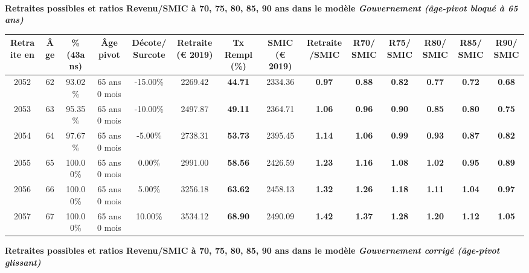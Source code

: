  ~\\{\bf \noindent Retraites possibles et ratios Revenu/SMIC à 70, 75, 80, 85, 90 ans dans le modèle \emph{Gouvernement (âge-pivot bloqué à 65 ans)}}  
 
\begin{adjustbox}{max width=\textwidth} 
\begin{tabular}[htb]{|c|c||c|c|c||c|c||c|c||c|c|c|c|c|} 
\hline 
 Retraite en &  Âge &  \%(43ans) &  Âge pivot &  Décote/Surcote &  Retraite (\euro{} 2019) &  Tx Rempl(\%) &  SMIC (\euro{} 2019) &  Retraite/SMIC &  R70/SMIC &  R75/SMIC &  R80/SMIC &  R85/SMIC &  R90/SMIC \\ 
\hline \hline 
 2052 &  62 &  93.02\% &  65 ans 0 mois &  -15.00\% &  2269.42 &  {\bf 44.71} &  2334.36 &  {\bf {\color{red} 0.97}} &  {\bf {\color{red} 0.88}} &  {\bf {\color{red} 0.82}} &  {\bf {\color{red} 0.77}} &  {\bf {\color{red} 0.72}} &  {\bf {\color{red} 0.68}} \\ 
\hline 
 2053 &  63 &  95.35\% &  65 ans 0 mois &  -10.00\% &  2497.87 &  {\bf 49.11} &  2364.71 &  {\bf 1.06} &  {\bf {\color{red} 0.96}} &  {\bf {\color{red} 0.90}} &  {\bf {\color{red} 0.85}} &  {\bf {\color{red} 0.80}} &  {\bf {\color{red} 0.75}} \\ 
\hline 
 2054 &  64 &  97.67\% &  65 ans 0 mois &  -5.00\% &  2738.31 &  {\bf 53.73} &  2395.45 &  {\bf 1.14} &  {\bf 1.06} &  {\bf {\color{red} 0.99}} &  {\bf {\color{red} 0.93}} &  {\bf {\color{red} 0.87}} &  {\bf {\color{red} 0.82}} \\ 
\hline 
 2055 &  65 &  100.00\% &  65 ans 0 mois &  0.00\% &  2991.00 &  {\bf 58.56} &  2426.59 &  {\bf 1.23} &  {\bf 1.16} &  {\bf 1.08} &  {\bf 1.02} &  {\bf {\color{red} 0.95}} &  {\bf {\color{red} 0.89}} \\ 
\hline 
 2056 &  66 &  100.00\% &  65 ans 0 mois &  5.00\% &  3256.18 &  {\bf 63.62} &  2458.13 &  {\bf 1.32} &  {\bf 1.26} &  {\bf 1.18} &  {\bf 1.11} &  {\bf 1.04} &  {\bf {\color{red} 0.97}} \\ 
\hline 
 2057 &  67 &  100.00\% &  65 ans 0 mois &  10.00\% &  3534.12 &  {\bf 68.90} &  2490.09 &  {\bf 1.42} &  {\bf 1.37} &  {\bf 1.28} &  {\bf 1.20} &  {\bf 1.12} &  {\bf 1.05} \\ 
\hline 
\hline 
\end{tabular} 
\end{adjustbox} 
 
 \vspace{0.1cm} 
{\bf \noindent Retraites possibles et ratios Revenu/SMIC à 70, 75, 80, 85, 90 ans dans le modèle \emph{Gouvernement corrigé (âge-pivot glissant)}}  
 
